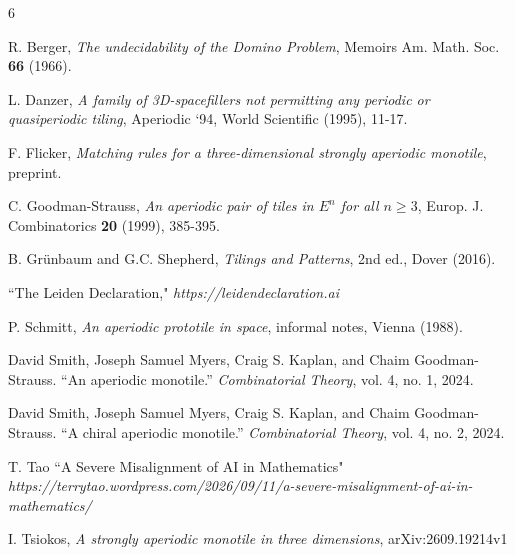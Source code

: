 \documentclass[11pt, oneside]{article}
\begin{document}
\begin{thebibliography}{6}


 {R. Berger}, {\em The undecidability of the Domino Problem},
Memoirs Am. Math. Soc.  {\bf 66} (1966).



 {L. Danzer}, {\em A family of 3D-spacefillers not permitting
any periodic or quasiperiodic tiling}, Aperiodic `94, World 
Scientific (1995), 11-17.

 F. Flicker, {\em Matching rules for a three-dimensional strongly aperiodic monotile}, preprint.


 {C. Goodman-Strauss}, {\em An aperiodic pair of 
tiles in  $E^n$
for all
$n\geq 3$},  Europ. J. Combinatorics {\bf 20} (1999), 385-395.








 {B. Gr\"unbaum} and {G.C. Shepherd}, {\em Tilings and Patterns}, 2nd ed., Dover (2016). %

 ``The Leiden Declaration,"
{\em https://leidendeclaration.ai}


 {P. Schmitt}, {\em An aperiodic prototile in 
space}, informal notes, Vienna (1988).

David Smith, Joseph Samuel Myers, Craig S. Kaplan, and Chaim Goodman-Strauss. 
``An aperiodic monotile.'' \textit{Combinatorial Theory}, vol. 4, no. 1, 2024.


David Smith, Joseph Samuel Myers, Craig S. Kaplan, and Chaim Goodman-Strauss. 
``A chiral aperiodic monotile.'' \textit{Combinatorial Theory}, vol. 4, no. 2, 2024.

 T. Tao
``A Severe Misalignment of AI in Mathematics" \\{\em https://terrytao.wordpress.com/2026/09/11/a-severe-misalignment-of-ai-in-mathematics/}


 I. Tsiokos, {\em A strongly aperiodic monotile in three dimensions}, arXiv:2609.19214v1


\end{thebibliography}
\end{document}
